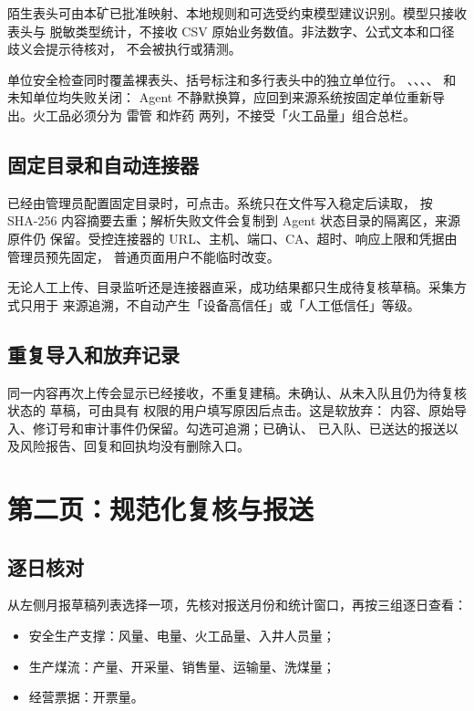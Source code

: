 \documentclass[UTF8,openany,zihao=-4,fontset=none]{ctexbook}
\begin{document}
陌生表头可由本矿已批准映射、本地规则和可选受约束模型建议识别。模型只接收表头与
脱敏类型统计，不接收 CSV 原始业务数值。非法数字、公式文本和口径歧义会提示待核对，
不会被执行或猜测。

\begin{warningbox}
单位安全检查同时覆盖裸表头、括号标注和多行表头中的独立单位行。
、、、、 和未知单位均失败关闭：
Agent 不静默换算，应回到来源系统按固定单位重新导出。火工品必须分为
雷管  和炸药  两列，不接受「火工品量」组合总栏。
\end{warningbox}

\subsection{固定目录和自动连接器}

已经由管理员配置固定目录时，可点击。系统只在文件写入稳定后读取，
按 SHA-256 内容摘要去重；解析失败文件会复制到 Agent 状态目录的隔离区，来源原件仍
保留。受控连接器的 URL、主机、端口、CA、超时、响应上限和凭据由管理员预先固定，
普通页面用户不能临时改变。

无论人工上传、目录监听还是连接器直采，成功结果都只生成待复核草稿。采集方式只用于
来源追溯，不自动产生「设备高信任」或「人工低信任」等级。

\subsection{重复导入和放弃记录}

同一内容再次上传会显示已经接收，不重复建稿。未确认、从未入队且仍为待复核状态的
草稿，可由具有  权限的用户填写原因后点击。这是软放弃：
内容、原始导入、修订号和审计事件仍保留。勾选可追溯；已确认、
已入队、已送达的报送以及风险报告、回复和回执均没有删除入口。

\section{第二页：规范化复核与报送}

\subsection{逐日核对}

从左侧月报草稿列表选择一项，先核对报送月份和统计窗口，再按三组逐日查看：

\begin{itemize}
  \item 安全生产支撑：风量、电量、火工品量、入井人员量；
  \item 生产煤流：产量、开采量、销售量、运输量、洗煤量；
  \item 经营票据：开票量。
\end{itemize}
\end{document}

